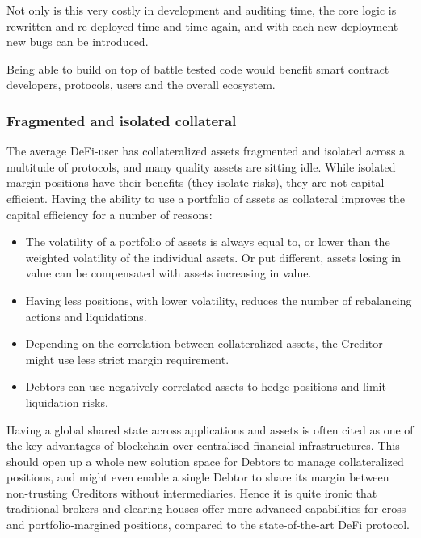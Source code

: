\documentclass[sigconf,nonacm]{acmart}
\begin{document}
Not only is this very costly in development and auditing time, the core logic is rewritten and re-deployed time and time again,
and with each new deployment new bugs can be introduced.

Being able to build on top of battle tested code would benefit smart contract developers, protocols, users and the overall ecosystem.

\subsubsection{Fragmented and isolated collateral}
\label{subsubsec:fragmented-collateral}

The average DeFi-user has collateralized assets fragmented and isolated across a multitude of protocols, and many quality assets are sitting idle.
While isolated margin positions have their benefits (they isolate risks), they are not capital efficient.
Having the ability to use a portfolio of assets as collateral improves the capital efficiency for a number of reasons:
\begin{itemize}
    \item The volatility of a portfolio of assets is always equal to, or lower than the weighted volatility of the individual assets.
    Or put different, assets losing in value can be compensated with assets increasing in value.
    \item Having less positions, with lower volatility, reduces the number of rebalancing actions and liquidations.
    \item Depending on the correlation between collateralized assets, the Creditor might use less strict margin requirement.
    \item Debtors can use negatively correlated assets to hedge positions and limit liquidation risks.
\end{itemize}

Having a global shared state across applications and assets is often cited as one of the key advantages of blockchain over centralised financial infrastructures\cite{schar2021decentralized}.
This should open up a whole new solution space for Debtors to manage collateralized positions,
and might even enable a single Debtor to share its margin between non-trusting Creditors without intermediaries.
Hence it is quite ironic that traditional brokers and clearing houses offer more advanced capabilities for cross- and portfolio-margined positions, compared to the state-of-the-art DeFi protocol.
\end{document}
